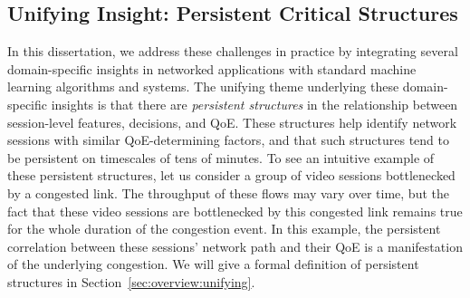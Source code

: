 \subsection{Unifying Insight: Persistent Critical Structures}
In this dissertation, we address these challenges in practice by integrating 
several domain-specific insights in networked applications with 
standard machine learning algorithms and systems. 
The unifying theme underlying these domain-specific insights is 
that there are {\em persistent structures} in the relationship
between session-level features, decisions, and QoE.
These structures help identify network sessions with similar 
QoE-determining factors, and that such structures tend to be 
persistent on timescales of tens of minutes.
To see an intuitive example of these persistent structures, let us consider 
a group of video sessions bottlenecked by a congested link.
The throughput of these flows may vary over time, but the fact
that these video sessions are bottlenecked by this congested link remains true 
for the whole duration of the congestion event.
In this example,  the persistent correlation between these sessions' 
network path and their QoE is a manifestation of the underlying congestion.
We will give a formal definition of persistent structures in
Section~\ref{sec:overview:unifying}.





%
%
%
%

